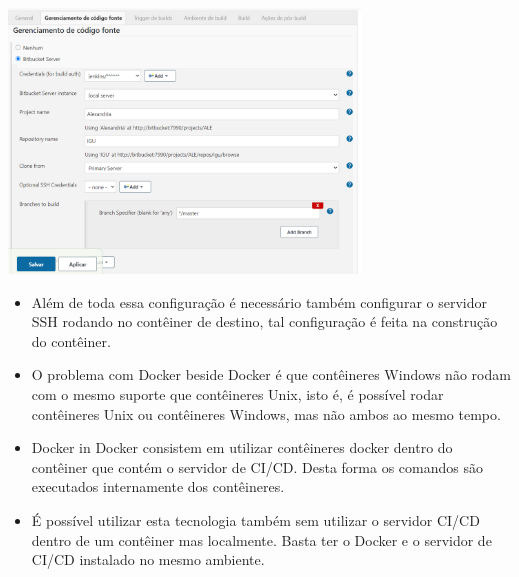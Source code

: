 \documentclass[10pt]{beamer}
\theoremstyle{remark}
\theoremstyle{definition}
\begin{document}
\begin{frame}[allowframebreaks]
	\framebreak
	
	\begin{center}
		\includegraphics[width=0.7\textwidth]{images/47.png}
	\end{center}
	
	\framebreak
	
	\begin{itemize}
	
		\item Além de toda essa configuração é necessário também configurar o servidor SSH rodando no contêiner de destino, tal configuração é feita na construção do contêiner.
	
		\item O problema com Docker beside Docker é que contêineres Windows não rodam com o mesmo suporte que contêineres Unix, isto é, é possível rodar contêineres Unix ou contêineres Windows, mas não ambos ao mesmo tempo.
		
	\end{itemize}
	
	\framebreak
	
	\begin{itemize}
	
		\item Docker in Docker consistem em utilizar contêineres docker dentro do contêiner que contém o servidor de CI/CD. Desta forma os comandos são executados internamente dos contêineres.
		
		\item É possível utilizar esta tecnologia também sem utilizar o servidor CI/CD dentro de um contêiner mas localmente. Basta ter o Docker e o servidor de CI/CD instalado no mesmo ambiente.
		
	\end{itemize}
	
	\framebreak
	
	\begin{itemize}
	

\end{itemize}
\end{frame}
\end{document}
